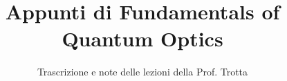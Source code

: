 \documentclass[a4paper,12pt]{article}
\title{Appunti di Fundamentals of Quantum Optics}
\author{Trascrizione e note delle lezioni della Prof. Trotta}
\date{}
\begin{document}
\maketitle
\projectintro
\tableofcontents
\newpage

\end{document}
